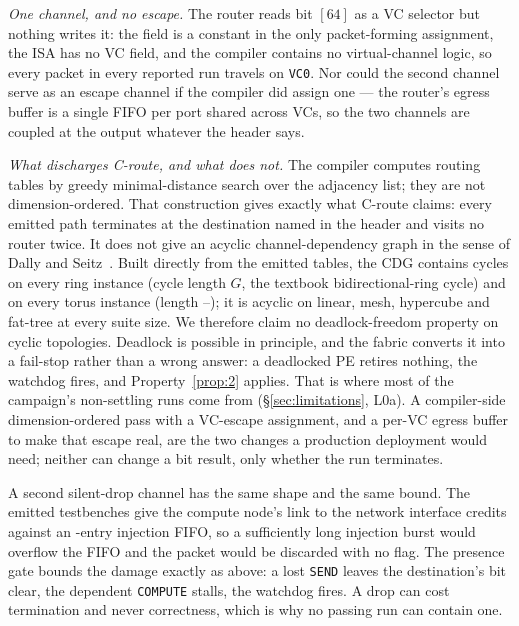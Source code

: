 \documentclass[journal,10pt]{IEEEtran}
\theoremstyle{plain}
\theoremstyle{definition}
\theoremstyle{remark}
\newcommand{\sv}[1]{\texttt{#1}}
\begin{document}
\emph{One channel, and no escape.} The router reads bit $[64]$ as a VC
selector but nothing writes it: the field is a constant in the only
packet-forming assignment, the ISA has no VC field, and the compiler contains
no virtual-channel logic, so every packet in every reported run travels on
\sv{VC0}. Nor could the second channel serve as an escape channel if the
compiler did assign one --- the router's egress buffer is a single FIFO per
port shared across VCs, so the two channels are coupled at the output whatever
the header says.

\emph{What discharges \textsf{C-route}, and what does not.} The compiler
computes routing tables by greedy minimal-distance search over the adjacency
list; they are not dimension-ordered. That construction gives exactly what
\textsf{C-route} claims: every emitted path terminates at the destination
named in the header and visits no router twice. It does not give an acyclic
channel-dependency graph in the sense of Dally and
Seitz~\cite{dally1987deadlock}. Built directly from the emitted tables, the CDG
contains cycles on every ring instance (cycle length $G$, the textbook
bidirectional-ring cycle) and on every torus instance (length
\CdgTorusCycLo--\CdgTorusCycHi); it is acyclic on linear, mesh, hypercube and
fat-tree at every suite size. We therefore claim no deadlock-freedom property
on cyclic topologies. Deadlock is possible in principle, and the fabric
converts it into a fail-stop rather than a wrong answer: a deadlocked PE
retires nothing, the watchdog fires, and Property~\ref{prop:2} applies. That
is where most of the campaign's non-settling runs come from
(\S\ref{sec:limitations}, L0a). A compiler-side dimension-ordered pass with a
VC-escape assignment, and a per-VC egress buffer to make that escape real,
are the two changes a production deployment would need; neither can change a
bit result, only whether the run terminates.

A second silent-drop channel has the same shape and the same bound. The
emitted testbenches give the compute node's link to the network interface
\NiCredits{} credits against an \NiFifoDepth-entry injection FIFO, so a
sufficiently long injection burst would overflow the FIFO and the packet
would be discarded with no flag. The presence gate bounds the damage exactly
as above: a lost \texttt{SEND} leaves the destination's bit clear, the
dependent \texttt{COMPUTE} stalls, the watchdog fires. A drop can cost
termination and never correctness, which is why no passing run can contain
one.
\end{document}
